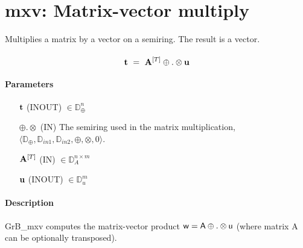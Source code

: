 

\section{{\sf mxv}: Matrix-vector multiply}

Multiplies a matrix by a vector on a semiring. The result is a vector.

\paragraph{\syntax}

$$
{\bf t}~ = ~ {\bf A}^{[T]} \oplus.\otimes {\bf u}
$$

\paragraph{Parameters}

\begin{itemize}[leftmargin=1.1in]
    \item[${\bf t}$]    ({\sf INOUT}) $\in \mathbb{D}_\oplus^{n}$

    \item[$\oplus.\otimes$]   ({\sf IN}) The semiring used in the matrix
    multiplication, $\langle \mathbb{D}_\oplus, \mathbb{D}_{in1},\mathbb{D}_{in2},\oplus,\otimes,0 \rangle$.

    \item[${\bf A}^{[T]}$]    ({\sf IN}) $\in \mathbb{D}_A^{n\times m}$

    \item[${\bf u}$]    ({\sf INOUT}) $\in \mathbb{D}_{u}^{m}$

\end{itemize}

\paragraph{Description}

{\sf GrB\_mxv} computes the matrix-vector product ${\sf w} = {\sf A}
\oplus . \otimes {\sf u}$ (where matrix {\sf A}
 can be optionally transposed).



